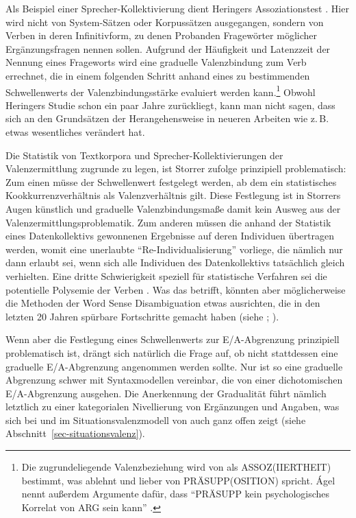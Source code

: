 Als Beispiel einer Sprecher-Kollektivierung dient \citet[93ff, 232ff]{Storrer:92} Heringers Assoziationstest \citep{Heringer:85}. Hier wird nicht von System-Sätzen oder Korpussätzen ausgegangen, sondern von Verben in deren Infinitivform, zu denen Probanden Fragewörter möglicher Ergänzungsfragen nennen sollen. Aufgrund der Häufigkeit und Latenzzeit der Nennung eines Frageworts wird eine graduelle Valenzbindung zum Verb errechnet, die in einem folgenden Schritt anhand eines zu bestimmenden Schwellenwerts der Valenzbindungsstärke evaluiert werden kann.\footnote{Die zugrundeliegende Valenzbeziehung wird von \citet[29]{Jacobs:94} als ASSOZ(IIERTHEIT) bestimmt, was \citet[209]{Agel:00} ablehnt und lieber von PRÄSUPP(OSITION) spricht. \'Agel nennt au\ss erdem Argumente dafür, dass "`PRÄSUPP kein psychologisches Korrelat von ARG sein kann"' \citep[210]{Agel:00}.}  Obwohl Heringers Studie schon ein paar Jahre zurückliegt, kann man nicht sagen, dass sich an den Grundsätzen der Herangehensweise in neueren Arbeiten wie z.\,B.\ \cite{SchulteImWalde:08} etwas wesentliches verändert hat.

Die Statistik von Textkorpora und Sprecher-Kollektivierungen der Valenzermittlung zugrunde zu legen, ist Storrer zufolge prinzipiell problematisch: Zum einen müsse der Schwellenwert festgelegt werden, ab dem ein statistisches Kookkurrenzverhältnis als Valenzverhältnis gilt. Diese Festlegung ist in Storrers Augen künstlich und graduelle Valenzbindungsma\ss e damit kein Ausweg aus der Valenzermittlungsproblematik. Zum anderen müssen die anhand der Statistik eines Datenkollektivs gewonnenen Ergebnisse auf deren Individuen übertragen werden, womit eine unerlaubte "`Re-Individualisierung"' \citep[233]{Storrer:92} vorliege, die nämlich nur dann erlaubt sei, wenn sich alle Individuen des Datenkollektivs tatsächlich gleich verhielten. Eine dritte Schwierigkeit speziell für statistische Verfahren sei die potentielle Polysemie der Verben \citep[Fußnote 174]{Storrer:92}. Was das betrifft, könnten aber möglicherweise die Methoden der Word Sense Disambiguation etwas ausrichten, die in den letzten 20 Jahren spürbare Fortschritte gemacht haben (siehe \citealt{McCarthy:09}; \citealt[Kapitel 20]{Jurafsky:Martin:09}).

Wenn aber die Festlegung eines Schwellenwerts zur E/A-Abgrenzung prinzipiell problematisch ist, drängt sich natürlich die Frage auf, ob nicht stattdessen eine graduelle E/A-Abgrenzung angenommen werden sollte. Nur ist so eine graduelle Abgrenzung schwer mit Syntaxmodellen vereinbar, die von einer dichotomischen E/A-Abgrenzung ausgehen. Die Anerkennung der Gradualität führt nämlich letztlich zu einer kategorialen Nivellierung von Ergänzungen und Angaben, was sich bei \cite{Heringer:84} und im Situationsvalenzmodell von \cite{Storrer:92} auch ganz offen zeigt (siehe Abschnitt~\ref{sec-situationsvalenz}).	        


